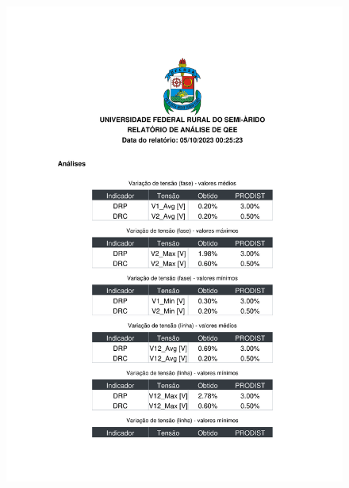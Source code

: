 \begin{figure}[H]
	\centering
  \includegraphics[height=20cm, page=3, clip]{contents/post_textual/analise_amostra_2.pdf}
\end{figure}
